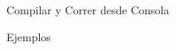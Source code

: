 \begin{section}
  {Compilar y Correr desde Consola}  
  
  \begin{subsection}
    {Ejemplos}
    
  \end{subsection}
  
\end{section}
